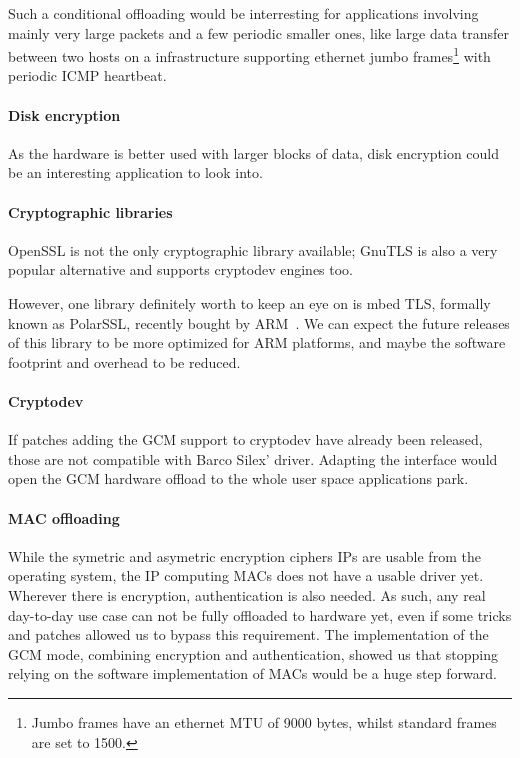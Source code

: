 Such a conditional offloading would be interresting for applications involving mainly very large packets and a few periodic smaller ones, like large data transfer between two hosts on a infrastructure supporting ethernet jumbo frames\footnote{Jumbo frames have an ethernet MTU of 9000 bytes, whilst standard frames are set to 1500.} with periodic ICMP heartbeat.

\paragraph{Disk encryption}
As the hardware is better used with larger blocks of data, disk encryption could be an interesting application to look into.

\paragraph{Cryptographic libraries}
OpenSSL is not the only cryptographic library available; GnuTLS is also a very popular alternative and supports cryptodev engines too.

However, one library definitely worth to keep an eye on is mbed TLS, formally known as PolarSSL, recently bought by ARM~\cite{2015-arm-buy-polarssl}.
We can expect the future releases of this library to be more optimized for ARM platforms, and maybe the software footprint and overhead to be reduced.


\paragraph{Cryptodev}
If patches adding the GCM support to cryptodev have already been released, those are not compatible with Barco Silex' driver.
Adapting the interface would open the GCM hardware offload to the whole user space applications park.

\paragraph{MAC offloading}
While the symetric and asymetric encryption ciphers IPs are usable from the operating system, the IP computing MACs does not have a usable driver yet.
Wherever there is encryption, authentication is also needed.
As such, any real day-to-day use case can not be fully offloaded to hardware yet, even if some tricks and patches allowed us to bypass this requirement.
The implementation of the GCM mode, combining encryption and authentication, showed us that stopping relying on the software implementation of MACs would be a huge step forward.


